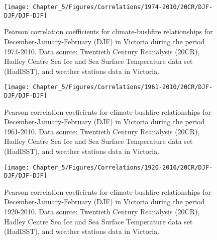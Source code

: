 \begin{figure}[h]
\noindent \begin{centering}
\texttt{[image: Chapter\_5/Figures/Correlations/1974-2010/20CR/DJF-DJF/DJF-DJF]}
\par\end{centering}

\caption[Pearson correlation coefficients for climate-bushfire relationships
for December-January-February (DJF) in Victoria during the period
1974-2010]{Pearson correlation coefficients for climate-bushfire relationships
for December-January-February (DJF) in Victoria during the period
1974-2010. Data source: Twentieth Century Reanalysis (20CR), Hadley
Centre Sea Ice and Sea Surface Temperature data set (HadISST), and
weather stations data in Victoria.\label{fig:Pearson correlation coeficients for climate-bushfire relationships for December-January-February in Victoria during the period 1974-2010}}
\end{figure}


\begin{figure}[h]
\noindent \begin{centering}
\texttt{[image: Chapter\_5/Figures/Correlations/1961-2010/20CR/DJF-DJF/DJF-DJF]}
\par\end{centering}

\caption[Pearson correlation coeficients for climate-bushfire relationships
for December-January-February (DJF) in Victoria during the period
1961-2010]{Pearson correlation coeficients for climate-bushfire relationships
for December-January-February (DJF) in Victoria during the period
1961-2010. Data source: Twentieth Century Reanalysis (20CR), Hadley
Centre Sea Ice and Sea Surface Temperature data set (HadISST), and
weather stations data in Victoria.\label{fig:Pearson correlation coeficients for climate-bushfire relationships for December-January-February in Victoria during the period 1961-2010}}
\end{figure}


\begin{figure}[h]
\noindent \begin{centering}
\texttt{[image: Chapter\_5/Figures/Correlations/1920-2010/20CR/DJF-DJF/DJF-DJF]}
\par\end{centering}

\caption[Pearson correlation coeficients for climate-bushfire relationships
for December-January-February (DJF) in Victoria during the period
1920-2010]{Pearson correlation coeficients for climate-bushfire relationships
for December-January-February (DJF) in Victoria during the period
1920-2010. Data source: Twentieth Century Reanalysis (20CR), Hadley
Centre Sea Ice and Sea Surface Temperature data set (HadISST), and
weather stations data in Victoria.\label{fig:Pearson correlation coeficients for climate-bushfire relationships for December-January-February in Victoria during the period 1920-2010}}
\end{figure}



